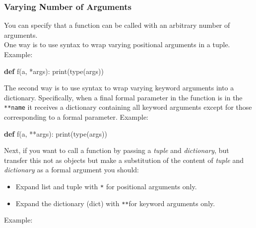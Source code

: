 \documentclass[
]{article}
\newenvironment{Shaded}{}{}
\newcommand{\BuiltInTok}[1]{#1}
\newcommand{\KeywordTok}[1]{\textcolor[rgb]{0.00,0.44,0.13}{\textbf{#1}}}
\newcommand{\NormalTok}[1]{#1}
\newcommand{\OperatorTok}[1]{\textcolor[rgb]{0.40,0.40,0.40}{#1}}
\begin{document}
\hypertarget{varying-number-of-arguments}{%
\subsubsection{Varying Number of
Arguments}\label{varying-number-of-arguments}}

You can specify that a function can be called with an arbitrary number
of arguments.\\
One way is to use syntax to wrap varying positional arguments in a
tuple. Example:

\begin{Shaded}
\begin{Highlighting}[]
\KeywordTok{def}\NormalTok{ f(a, }\OperatorTok{*}\NormalTok{args):}
    \BuiltInTok{print}\NormalTok{(}\BuiltInTok{type}\NormalTok{(args))}
\end{Highlighting}
\end{Shaded}

The second way is to use syntax to wrap varying keyword arguments into a
dictionary. Specifically, when a final formal parameter in the function
is in the \texttt{**name} it receives a dictionary containing all
keyword arguments except for those corresponding to a formal parameter.
Example:

\begin{Shaded}
\begin{Highlighting}[]
\KeywordTok{def}\NormalTok{ f(a, }\OperatorTok{**}\NormalTok{args):}
    \BuiltInTok{print}\NormalTok{(}\BuiltInTok{type}\NormalTok{(args))}
\end{Highlighting}
\end{Shaded}

Next, if you want to call a function by passing a \emph{tuple} and
\emph{dictionary}, but transfer this not as objects but make a
substitution of the content of \emph{tuple} and \emph{dictionary} as a
formal argument you should:

\begin{itemize}
\item
  Expand list and tuple with \texttt{*} for positional arguments only.
\item
  Expand the dictionary (dict) with \texttt{**}for keyword arguments
  only.
\end{itemize}

Example:
\end{document}
